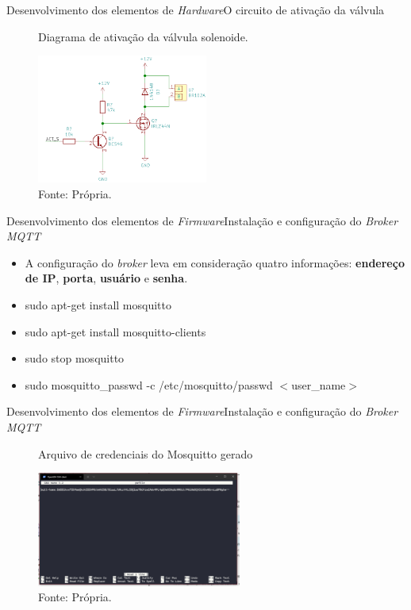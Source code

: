 \begin{frame}{Desenvolvimento dos elementos de \textit{Hardware}}{O circuito de ativação da válvula}
  \begin{figure}[H]
    \centering
    \caption{Diagrama de ativação da válvula solenoide.}
    \includegraphics[width=0.5\textwidth]{figuras/ativa_valvula.png}
    \caption*{\tiny{Fonte: Própria.}}
    \label{fig:diagramavalvula}
  \end{figure} 
  
\end{frame}

\begin{frame}{Desenvolvimento dos elementos de \textit{Firmware}}{Instalação e configuração do \textit{Broker MQTT}}
  \begin{itemize}
    \item  A configuração do \textit{broker} leva em consideração quatro informações: \textbf{endereço de IP}, \textbf{porta}, \textbf{usuário} e \textbf{senha}.
  \end{itemize}
 
  \begin{block}{}
    \begin{itemize}
      \item sudo apt-get install mosquitto
      \item sudo apt-get install mosquitto-clients
      \item sudo stop mosquitto
      \item sudo mosquitto\_passwd -c /etc/mosquitto/passwd $<$user\_name$>$
    \end{itemize} 
  \end{block} 
\end{frame}

\begin{frame}{Desenvolvimento dos elementos de \textit{Firmware}}{Instalação e configuração do \textit{Broker MQTT}}
  \begin{figure}[H]
    \centering
    \caption{Arquivo de credenciais do Mosquitto gerado}
    \includegraphics[width=0.6\textwidth]{figuras/user_pass.png}
    \caption*{\tiny{Fonte: Própria.}}
    \label{fig:cred_mqtt}
  \end{figure}
\end{frame}

